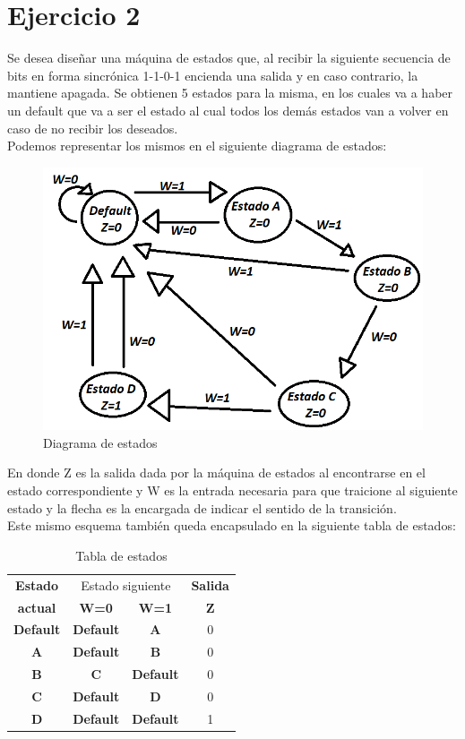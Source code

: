 \chapter{Ejercicio 2}
Se desea diseñar una máquina de estados que, al recibir la siguiente secuencia de bits en forma sincrónica 1-1-0-1 encienda una salida y en caso contrario, la mantiene apagada. Se obtienen 5 estados para la misma, en los cuales va a haber un default que va a ser el estado al cual todos los demás estados van a volver en caso de no recibir los deseados.\\
Podemos representar los mismos en el siguiente diagrama de estados:\\
\begin{figure}[h!]
	\centering
	\includegraphics[scale=0.4]{../Ejercicio-2/Diagrama_de_estados.png}
	\caption{Diagrama de estados}
\end{figure}
En donde Z es la salida dada por la máquina de estados al encontrarse en el estado correspondiente y W es la entrada necesaria para que traicione al siguiente estado y la flecha es la encargada de indicar el sentido de la transición.\\
Este mismo esquema también queda encapsulado en la siguiente tabla de estados:\\
\FloatBarrier
\begin{table}[h!]
	\begin{center}
		\caption{Tabla de estados}
			\begin{tabular}{|c|c c|c|}
			\hline
			\textbf{Estado} &\multicolumn{2}{|c|}{Estado siguiente} & \textbf{Salida}\\
			\textbf{actual} & \textbf{ W=0 } & \textbf{ W=1 } & \textbf{Z}\\
			\hline
			\textbf{Default} & \textbf{ Default } & \textbf{ A } & 0\\
			\hline
			\textbf{A} & \textbf{ Default } & \textbf{ B } & 0\\
			\hline
			\textbf{B} & \textbf{ C } & \textbf{Default } & 0\\
			\hline
			\textbf{C} & \textbf{ Default } & \textbf{ D } & 0\\
			\hline
			\textbf{D} & \textbf{Default } & \textbf{Default} & 1\\
			\hline
			\end{tabular}
	\end{center}
\end{table}
